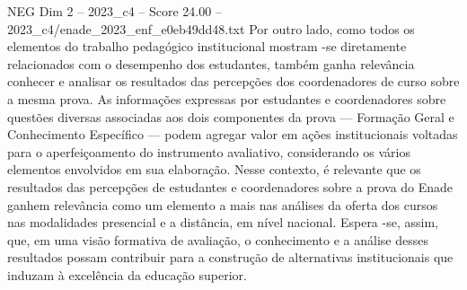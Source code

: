 \begin{textsample}{NEG Dim 2 – 2023\_c4 – Score 24.00 – 2023\_c4/enade\_2023\_enf\_e0eb49dd48.txt}
Por outro lado, como todos os elementos do trabalho pedagógico institucional mostram -se diretamente relacionados com o desempenho dos estudantes, também ganha relevância conhecer e analisar os resultados das percepções dos coordenadores de curso sobre a mesma prova.
As informações expressas por estudantes e coordenadores sobre questões diversas associadas aos dois componentes da prova — Formação Geral e Conhecimento Específico — podem agregar valor em ações institucionais voltadas para o aperfeiçoamento do instrumento avaliativo, considerando os vários elementos envolvidos em sua elaboração.
Nesse contexto, é relevante que os resultados das percepções de estudantes e coordenadores sobre a prova do Enade ganhem relevância como um elemento a mais nas análises da oferta dos cursos nas modalidades presencial e a distância, em nível nacional.
Espera -se, assim, que, em uma visão formativa de avaliação, o conhecimento e a análise desses resultados possam contribuir para a construção de alternativas institucionais que induzam à excelência da educação superior.

\end{textsample}
